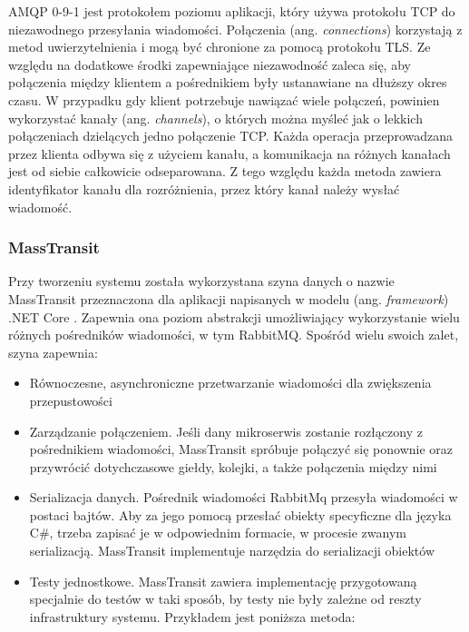 AMQP 0-9-1 jest protokołem poziomu aplikacji, który używa protokołu TCP do niezawodnego 
przesyłania wiadomości. Połączenia (ang. \textit{connections}) korzystają z metod 
uwierzytelnienia i mogą być chronione za pomocą protokołu TLS. Ze względu na dodatkowe 
środki zapewniające niezawodność zaleca się, aby połączenia między klientem 
a pośrednikiem były ustanawiane na dłuższy okres czasu. W przypadku gdy klient 
potrzebuje nawiązać wiele połączeń, powinien wykorzystać kanały (ang. 
\textit{channels}), o których można myśleć jak o lekkich połączeniach dzielących jedno 
połączenie TCP. Każda operacja przeprowadzana przez klienta odbywa się z użyciem 
kanału, a komunikacja na różnych kanałach jest od siebie całkowicie odseparowana. 
Z tego względu każda metoda zawiera identyfikator kanału dla rozróżnienia, przez 
który kanał należy wysłać wiadomość.

\subsubsection{MassTransit}

Przy tworzeniu systemu została wykorzystana szyna danych o nazwie MassTransit 
przeznaczona dla aplikacji napisanych w modelu (ang. \textit{framework}) .NET Core
\cite{masstransit2022}. Zapewnia ona poziom 
abstrakcji umożliwiający wykorzystanie wielu różnych pośredników wiadomości, w 
tym RabbitMQ. Spośród wielu swoich zalet, szyna zapewnia:

\begin{itemize} %
    \item Równoczesne, asynchroniczne przetwarzanie wiadomości dla zwiększenia 
    przepustowości
    \item Zarządzanie połączeniem. Jeśli dany mikroserwis zostanie rozłączony 
    z pośrednikiem wiadomości, MassTransit spróbuje połączyć się ponownie oraz 
    przywrócić dotychczasowe giełdy, kolejki, a także połączenia między nimi
    \item Serializacja danych. Pośrednik wiadomości RabbitMq przesyła wiadomości 
    w postaci bajtów. Aby za jego pomocą przesłać obiekty specyficzne dla języka 
    C\#, trzeba zapisać je w odpowiednim formacie, w procesie zwanym serializacją. 
    MassTransit implementuje narzędzia do serializacji obiektów
    \item Testy jednostkowe. MassTransit zawiera implementację przygotowaną specjalnie 
    do testów w taki sposób, by testy nie były zależne od reszty infrastruktury 
    systemu. Przykładem jest poniższa metoda:
\end{itemize}


